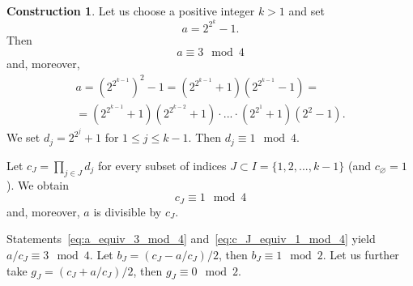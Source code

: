\documentclass[a4paper,14pt]{article} %
\theoremstyle{plain}
\theoremstyle{definition}
\newtheorem{construction}[theorem]{Construction}
\begin{document}
\begin{construction}
	\label{con:planar_set_with_minimeter_1}
	Let us choose a positive integer $k > 1$ and set
	\begin{equation}
		a = 2^{2^k} - 1
		.
	\end{equation}
	Then
	\begin{equation}
		\label{eq:a_equiv_3_mod_4}
		a \equiv 3 \mod 4
	\end{equation}
	and, moreover,
	\begin{multline}
		a = \left(2^{2^{k-1}}\right)^2 - 1
		=
		\left(2^{2^{k-1}} + 1\right) \left(2^{2^{k-1}} - 1\right)
		=
		\\=
		\left(2^{2^{k-1}} + 1\right) \left(2^{2^{k-2}} + 1\right) \cdot ... \cdot \left(2^{2^1} + 1\right) \left(2^2 - 1\right)
		.
	\end{multline}
	We set $d_j = 2^{2^j} + 1$ for $1 \leq j \leq k-1$.
	Then $d_j \equiv 1 \mod 4$.

	Let $c_J = \prod_{j\in J} d_j$ for every subset of indices $J\subset I = \{1,2,...,k-1\}$
	(and  $c_\varnothing = 1$).
	We obtain
	\begin{equation}
		\label{eq:c_J_equiv_1_mod_4}
		c_J\equiv 1 \mod{4}
	\end{equation}
	and, moreover, $a$ is divisible by $c_J$.


	Statements~\eqref{eq:a_equiv_3_mod_4} and~\eqref{eq:c_J_equiv_1_mod_4} yield $a/c_J \equiv 3 \mod 4$.
	Let $b_J = (c_J - a/c_J)/2$, then $b_J \equiv 1 \mod 2$.
	Let us further take $g_J = (c_J + a/c_J)/2$, then $g_J \equiv 0 \mod 2$.


\end{construction}
\end{document}
